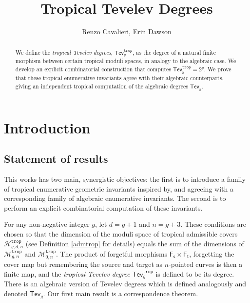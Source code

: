 \documentclass[11pt,reqno]{amsart}
\title{Tropical Tevelev Degrees}
\author{Renzo Cavalieri,  Erin Dawson}
\theoremstyle{definition}
\newcommand{\ecolor}[1]{{\color{WildStrawberry} #1}}
\newcommand\trop{{\mathtt{trop}}}
\newcommand\Mgn[1]{\mathcal M_{#1}}
\newcommand\Hur[1]{\mathcal H_{#1}}
\newcommand{\Ft}{\mathsf{F_t}}
\newcommand{\Fs}{\mathsf{F_s}}
\newcommand{\Tev}{{\mathsf{Tev}}}
\begin{document}
\maketitle
\begin{abstract}
    We define the {\it tropical Tevelev degrees}, $\Tev_g^\trop$,  as the degree of a natural finite morphism between certain tropical moduli spaces, in analogy to the algebraic case.  We  develop an explicit combinatorial construction that computes $\Tev_g^\trop = 2^g$.  We prove that these tropical enumerative invariants agree with their algebraic counterparts,  giving an independent tropical computation of the algebraic degrees $\Tev_g$.
\end{abstract}
\section{Introduction}

\subsection{Statement of results} \label{sec:isr}
This works has two main, synergistic objectives: the first is to introduce a family of tropical enumerative geometric invariants inspired by, and agreeing with a corresponding family of algebraic enumerative invariants. The second is to perform an explicit combinatorial computation of these invariants.

For any non-negative integer $g$, let $d = g+1$ and $n = g+3$. These conditions are chosen so that the dimension of the moduli space  of tropical admissible covers $\Hur{g,d,n}^{\trop}$ (see Definition \ref{admtrop} for details) equals the sum of the dimensions of $\Mgn{g,n}^\trop$ and $\Mgn{0,n}^\trop$. The product of forgetful morphisms $\Fs\times \Ft$, forgetting the cover map but remembering the source and target as $n$-pointed curves is then a finite map, and the {\it tropical Tevelev degree} $\Tev_g^\trop$ is defined to be its degree.
There is an algebraic version of Tevelev degrees which is defined analogously and denoted $\Tev_g$. Our first main result is a correspondence theorem.
\end{document}

